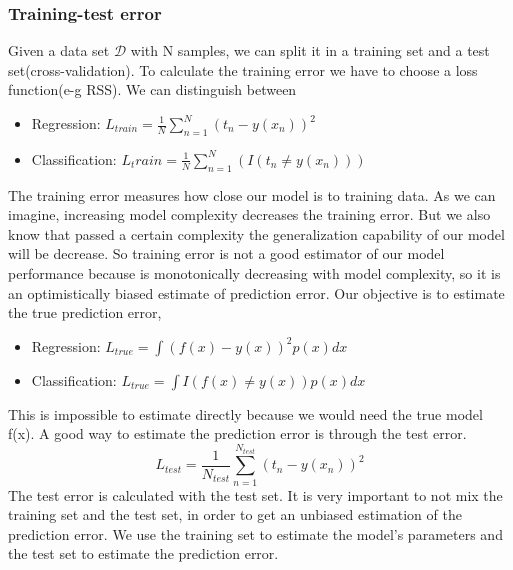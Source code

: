 \documentclass[main.tex]{subfiles}
\begin{document}
\subsubsection{Training-test error}
Given a data set $\mathcal{D}$ with N samples, we can split it in a training set and a test set(cross-validation).
To calculate the training error we have to choose a loss function(e-g RSS).
We can distinguish between 
\begin{itemize}
    \item Regression: $L_{train} = \frac{1}{N} \sum_{n=1}^N (t_n - y(x_n))^2$
    \item Classification: $L_train = \frac{1}{N} \sum_{n=1}^N (I(t_n \neq y(x_n)))$
\end{itemize}
The training error measures how close our model is to training data. As we can imagine, increasing model complexity decreases the training error. But we also know that passed a certain complexity the generalization capability of our model will be decrease. So training error is not a good estimator of our model performance because is monotonically decreasing with model complexity, so it is an optimistically biased estimate of prediction error.
Our objective is to estimate the true prediction error,
\begin{itemize}
    \item Regression: $L_{true} = \int (f(x) - y(x))^2 p(x)dx$
    \item Classification: $L_{true} = \int I(f(x) \neq y(x)) p(x)dx$
\end{itemize}
This is impossible to estimate directly because we would need the true model f(x). A good way to estimate the prediction error is through the test error.
\begin{equation}
    L_{test} = \frac{1}{N_{test}} \sum_{n=1}^{N_{test}} (t_n - y(x_n))^2
\end{equation}
The test error is calculated with the test set. It is very important to not mix the training set and the test set, in order to get an unbiased estimation of the prediction error.
We use the training set to estimate the model's parameters and the test set to estimate the prediction error.
\end{document}
